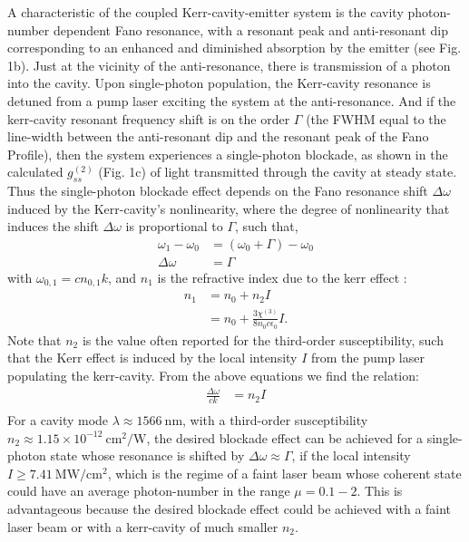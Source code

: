 \documentclass[12pt]{article}
\begin{document}
A characteristic of the coupled Kerr-cavity-emitter system is the cavity 
photon-number dependent Fano resonance, with a resonant peak and 
anti-resonant dip corresponding to an enhanced and diminished absorption by the
emitter (see Fig. 1b). Just at the vicinity of the  anti-resonance, there is 
transmission of a photon into the cavity. Upon single-photon population, the
Kerr-cavity resonance is detuned from a pump laser exciting the system at the
anti-resonance. And if the kerr-cavity resonant frequency shift is on the order 
$\Gamma$ (the FWHM equal to the line-width between the anti-resonant dip and 
the resonant peak of the Fano Profile), then the system experiences a 
single-photon blockade, as shown in the calculated $g^{(2)}_{ss}$ (Fig. 1c) 
of light transmitted through the cavity at steady state. Thus the single-photon 
blockade effect depends on the Fano resonance shift $\Delta\omega$ induced by the 
Kerr-cavity's nonlinearity, where the degree of nonlinearity that induces the 
shift $\Delta\omega$ is proportional to $\Gamma$, such that,
\begin{equation}
\begin{split}
\omega_1 - \omega_0 &= (\omega_0 + \Gamma ) - \omega_0
\\
\Delta\omega &= \Gamma
\end{split}
\end{equation}
with $\omega_{0,1} = c n_{0,1} k$, and $n_1$ is the refractive index due
to the kerr effect \cite{spillane2002ultralow}:
\begin{equation}
\begin{split}
n_1 &= n_0 + n_2 I
\\
&= n_0 + \frac{3 \chi^{(3)}}{8 n_0 c\epsilon_0} I.
\end{split}
\end{equation}
Note that $n_2$ is the value often reported for the third-order susceptibility,
such that the Kerr effect is induced by the local intensity $I$ from the pump 
laser populating the kerr-cavity. From the above equations we find the relation:
\begin{equation}
\begin{split}
\frac{\Delta \omega}{ck} &= n_2 I \\
\end{split}
\end{equation}
For a cavity mode $\lambda \approx 1566 \:\mathrm{nm}$,
\cite{pan2019elucidating, heylman2013photothermal} with a third-order 
susceptibility $n_2 \approx 1.15 \times 10^{-12} \:\mathrm{cm}^2/\mathrm{W}$, 
\cite{qin2010design} the desired blockade effect can be achieved for a 
single-photon state whose resonance is shifted by $\Delta\omega \approx 
\Gamma$, if the local intensity $I \ge 7.41 \: \mathrm{MW}/\mathrm{cm^2}$, 
which is the regime of a faint laser beam whose coherent state could have an 
average photon-number in the range $\mu = 0.1-2$. \cite{al2008characterization}
This is advantageous because the desired blockade effect could be achieved with 
a faint laser beam or with a kerr-cavity of much smaller $n_2$.
\end{document}
